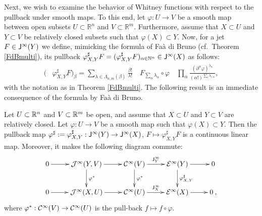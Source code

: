 Next, we wish to examine the behavior of Whitney functions with respect to the pullback 
 under smooth maps. To this end, let  $\varphi:U \to V$ be a smooth map  between
open subsets $U\subset \mathbb R^n$ and $V\subset \mathbb R^m$. 
Furthermore, assume that $X\subset U$ 
  and $Y\subset V$ be relatively closed subsets such that $\varphi(X)\subset Y$. 
Now, for a jet  $F \in \mathsf{J}^\infty (Y)$  we  define, mimicking the formula of Fa{\`a} di Bruno 
(cf.~Theorem \ref{FdBmulti}), its  pullback  
  $\varphi_{X,Y}^{\sharp} F = (\varphi_{X,Y}^{\sharp} F )_{\alpha \in \mathbb{N}^n} \in \mathsf{J}^\infty (X)$ 
  as follows: 
  \begin{equation}
    \label{Eq:DefPullbackJet}
    \begin{split}
      (& \varphi_{X,Y}^{\sharp}  F )_\beta= \sum_{\lambda \in \Lambda_{n,m}(\beta)} \frac{\beta !}{\lambda !} \quad F_{\sum_{\alpha}\lambda_\alpha} \circ \varphi \quad \prod_{\alpha}\frac{\left(\partial^\alpha \varphi\right)^{\lambda_\alpha}}{(\alpha!)^{\sum_i \lambda_{i,\alpha}}}
    ,
  \end{split}
  \end{equation}
with the notation as in Theorem \ref{FdBmulti}.
  The following result is an immediate consequence of the formula by 
  Fa{\`a} di Bruno. 
\begin{theorem}
\label{Thm:PullbackJet}
  Let $U\subset \mathbb{R}^n$ and $V\subset \mathbb{R}^m$ be open, and assume that $X\subset U$ 
  and $Y\subset V$ are relatively closed. Let $\varphi: U \rightarrow V$ be a 
  smooth map such that $\varphi (X) \subset Y$. 
  Then the pullback map $\varphi^{\sharp}:=\varphi_{X,Y}^{\sharp} : \mathsf{J}^\infty (Y) \rightarrow \mathsf{J}^\infty (X)$,
  $F\mapsto \varphi_{X,Y}^{\sharp} F$ is a continuous linear map. 
  Moreover, it makes the following diagram commute:
  \begin{equation}
  \xymatrix{
      0\ar[r]& \calJ^\infty(Y,V)\ar[r]\ar[d]^{\varphi^*}
      &\calC^\infty(V)\ar[r]^{\sfJ^\infty_Y}\ar[d]^{\varphi^*}&
      \calE^\infty(Y) \ar[r]\ar[d]^{\varphi_{X,Y}^{\sharp}}&0\\
      0 \ar[r]&\calJ^\infty(X,U)\ar[r]& \calC^\infty(U) \ar[r]^{\sfJ^\infty_X} &
      \calE^\infty(X)  \ar[r]& 0 \:,
  }\label{DefPullbackWhi}
\end{equation}
  where $\varphi^* : \mathcal{C}^\infty(V) \rightarrow \mathcal{C}^\infty(U)$ is the pull-back
  $f \mapsto f\circ \varphi$.
\end{theorem}
